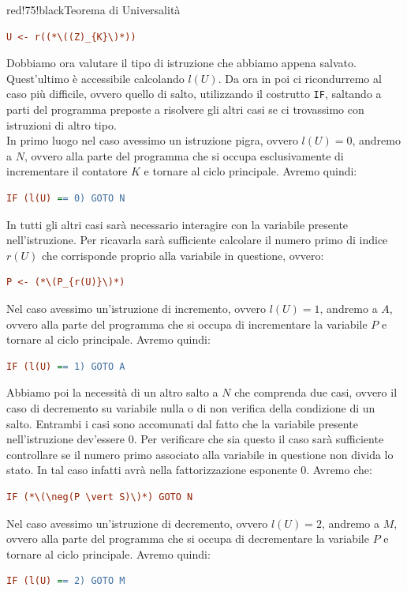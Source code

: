 \begin{halfframedbox}{red!75!black}{Teorema di Universalità}
  \begin{lstlisting}[language=ini, caption={ }]
    U <- r((*\((Z)_{K}\)*))
  \end{lstlisting}
  Dobbiamo ora valutare il tipo di istruzione che abbiamo appena salvato. Quest'ultimo è accessibile calcolando \(l(U)\). Da ora in poi ci ricondurremo al caso più difficile, ovvero quello di salto, utilizzando il costrutto \lstinline{IF}, saltando a parti del programma preposte a risolvere gli altri casi se ci trovassimo con istruzioni di altro tipo.\\
  In primo luogo nel caso avessimo un istruzione pigra, ovvero \(l(U)=0\), andremo a \(N\), ovvero alla parte del programma che si occupa esclusivamente di incrementare il contatore \(K\) e tornare al ciclo principale. Avremo quindi:
  \begin{lstlisting}[language=ini, caption={ }]
    IF (l(U) == 0) GOTO N
  \end{lstlisting}
  In tutti gli altri casi sarà necessario interagire con la variabile presente nell'istruzione. Per ricavarla sarà sufficiente calcolare il numero primo di indice \(r(U)\) che corrisponde proprio alla variabile in questione, ovvero:
  \begin{lstlisting}[language=ini, caption={ }]
    P <- (*\(P_{r(U)}\)*)
  \end{lstlisting}
  Nel caso avessimo un'istruzione di incremento, ovvero \(l(U)=1\), andremo a \(A\), ovvero alla parte del programma che si occupa di incrementare la variabile \(P\) e tornare al ciclo principale. Avremo quindi:
  \begin{lstlisting}[language=ini, caption={ }]
    IF (l(U) == 1) GOTO A
  \end{lstlisting}
  Abbiamo poi la necessità di un altro salto a \(N\) che comprenda due casi, ovvero il caso di decremento su variabile nulla o di non verifica della condizione di un salto. Entrambi i casi sono accomunati dal fatto che la variabile presente nell'istruzione dev'essere \(0\). Per verificare che sia questo il caso sarà sufficiente controllare se il numero primo associato alla variabile in questione non divida lo stato. In tal caso infatti avrà nella fattorizzazione esponente \(0\). Avremo che:
  \begin{lstlisting}[language=ini, caption={ }]
    IF (*\(\neg(P \vert S)\)*) GOTO N
  \end{lstlisting}
  Nel caso avessimo un'istruzione di decremento, ovvero \(l(U)=2\), andremo a \(M\), ovvero alla parte del programma che si occupa di decrementare la variabile \(P\) e tornare al ciclo principale. Avremo quindi:
  \begin{lstlisting}[language=ini, caption={ }]
    IF (l(U) == 2) GOTO M
  \end{lstlisting}


\end{halfframedbox}
